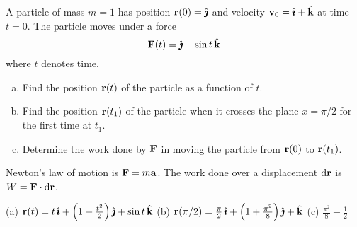 \begin{question}[M317 2012J] %
A particle of mass $m = 1$ has position $\mathbf{r}(0) = \hat{\pmb{\jmath}}$ and 
velocity $\mathbf{v}_0 = \hat{\pmb{\imath}} + \hat{\mathbf{k}}$ at time $t = 0$. The particle moves 
under a force 
\begin{equation*}
\mathbf{F}(t) = \hat{\pmb{\jmath}} - \sin t\,\hat{\mathbf{k}}
\end{equation*}
where $t$ denotes time.
\begin{enumerate}[(a)]
\item
Find the position $\mathbf{r}(t)$ of the particle as a function of $t$.
\item
Find the position $\mathbf{r}(t_1)$ of the particle when it crosses the 
plane $x = \pi/2$ for the first time at $t_1$.
\item
Determine the work done by $\mathbf{F}$ in moving the particle from $\mathbf{r}(0)$ to 
$\mathbf{r}(t_1)$.
\end{enumerate}
\end{question}

\begin{hint} 
Newton's law of motion is $\mathbf{F}=m\mathbf{a}$. The work done over a displacement $\mathrm{d}\mathbf{r}$ is $W=\mathbf{F} \cdot \mathrm{d}\mathbf{r}$.
\end{hint}

\begin{answer} 
(a) $\mathbf{r}(t) = t\,\hat{\pmb{\imath}} +\Big(1+\frac{t^2}{2}\Big)\,\hat{\pmb{\jmath}} + \sin t\,\hat{\mathbf{k}}$\qquad
(b) $\mathbf{r}(\pi/2) = \frac{\pi}{2}\,\hat{\pmb{\imath}}  +\Big(1+\frac{\pi^2}{8}\Big)\,\hat{\pmb{\jmath}} + \hat{\mathbf{k}}$
   \qquad
(c) $\frac{\pi^2}{8}-\frac{1}{2}$
\end{answer}

